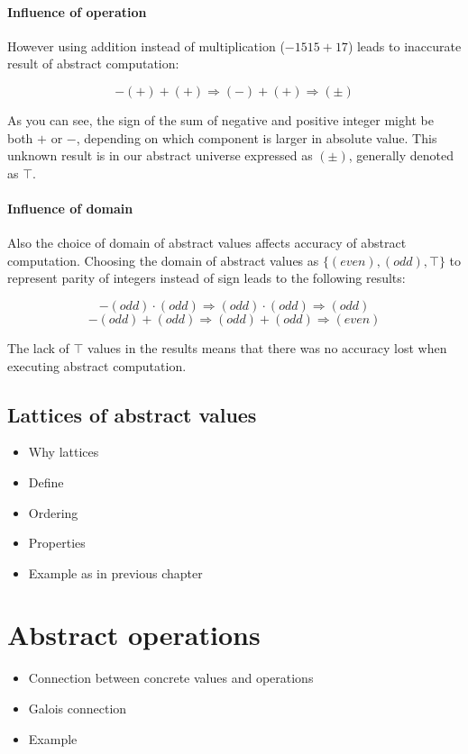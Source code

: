 \documentclass[12pt,oneside,draft]{fithesis2}
\begin{document}
\paragraph{Influence of operation}
However using addition instead of multiplication ($-1515 + 17$) leads to inaccurate result of abstract computation:

\[ -(+) + (+) \Rightarrow (-) + (+) \Rightarrow (\pm) \]

As you can see, the sign of the sum of negative and positive integer might be both $+$ or $-$, depending on which component is larger in absolute value. This unknown result is in our abstract universe expressed as $(\pm)$, generally denoted as $\top$.

\paragraph{Influence of domain}
Also the choice of domain of abstract values affects accuracy of abstract computation. Choosing the domain of abstract values as $\{(even), (odd), \top\}$ to represent parity of integers instead of sign leads to the following results:

\[ -(odd) \cdot (odd) \Rightarrow (odd) \cdot (odd) \Rightarrow (odd) \]
\[ -(odd) + (odd) \Rightarrow (odd) + (odd) \Rightarrow (even) \]

The lack of $\top$ values in the results means that there was no accuracy lost when executing abstract computation.

\subsection{Lattices of abstract values}\label{subsec:lattices}
\begin{itemize}
  \item Why lattices
  \item Define
  \item Ordering
  \item Properties
  \item Example as in previous chapter
\end{itemize}

\section{Abstract operations}
\begin{itemize}
  \item Connection between concrete values and operations
  \item Galois connection
  \item Example
\end{itemize}
\end{document}
